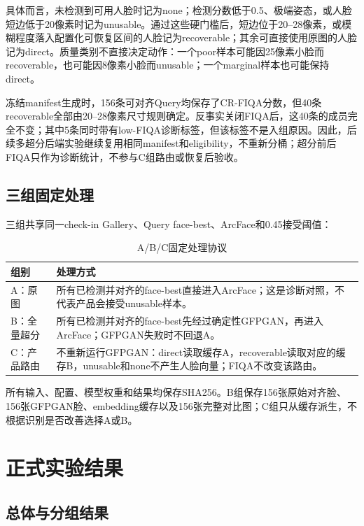 \documentclass[UTF8,a4paper,11pt]{ctexart}
\begin{document}
具体而言，未检测到可用人脸时记为none；检测分数低于0.5、极端姿态，或人脸短边低于20像素时记为unusable。通过这些硬门槛后，短边位于20--28像素，或模糊程度落入配置化可恢复区间的人脸记为recoverable；其余可直接使用原图的人脸记为direct。质量类别不直接决定动作：一个poor样本可能因25像素小脸而recoverable，也可能因8像素小脸而unusable；一个marginal样本也可能保持direct。

冻结manifest生成时，156条可对齐Query均保存了CR-FIQA分数，但40条recoverable全部由20--28像素尺寸规则确定。反事实关闭FIQA后，这40条的成员完全不变；其中5条同时带有low-FIQA诊断标签，但该标签不是入组原因。因此，后续多超分后端实验继续复用相同manifest和eligibility，不重新分桶；超分前后FIQA只作为诊断统计，不参与C组路由或恢复后验收。

\subsection{三组固定处理}

三组共享同一check-in Gallery、Query face-best、ArcFace和0.45接受阈值：

\begin{table}[H]
\centering
\caption{A/B/C固定处理协议}
\label{tab:protocol}
\renewcommand{\arraystretch}{1.2}
\begin{tabular}{p{}p{}}
\toprule
组别 & 处理方式\\
\midrule
A：原图 & 所有已检测并对齐的face-best直接进入ArcFace；这是诊断对照，不代表产品会接受unusable样本。\\
B：全量超分 & 所有已检测并对齐的face-best先经过确定性GFPGAN，再进入ArcFace；GFPGAN失败时不回退A。\\
C：产品路由 & 不重新运行GFPGAN：direct读取缓存A，recoverable读取对应的缓存B，unusable和none不产生人脸向量；FIQA不改变该路由。\\
\bottomrule
\end{tabular}
\end{table}

所有输入、配置、模型权重和结果均保存SHA256。B组保存156张原始对齐脸、156张GFPGAN脸、embedding缓存以及156张完整对比图；C组只从缓存派生，不根据识别是否改善选择A或B。

\section{正式实验结果}

\subsection{总体与分组结果}
\end{document}
